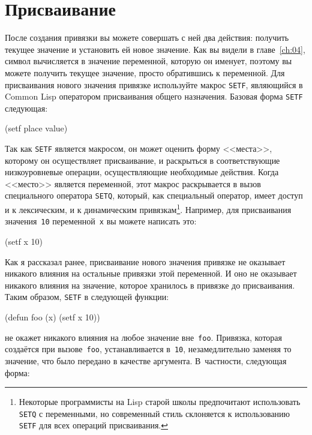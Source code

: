 \section{Присваивание}

После создания привязки вы можете совершать с ней два действия: получить текущее значение
и установить ей новое значение. Как вы видели в главе~\ref{ch:04}, символ вычисляется в
значение переменной, которую он именует, поэтому вы можете получить текущее значение,
просто обратившись к переменной. Для присваивания нового значения привязке используйте
макрос \lstinline{SETF}, являющийся в Common Lisp оператором присваивания общего назначения.
Базовая форма \lstinline{SETF} следующая:

\begin{myverb}
(setf place value)
\end{myverb}

Так как \lstinline{SETF} является макросом, он может оценить форму <<места>>, которому он
осуществляет присваивание, и раскрыться в соответствующие низкоуровневые
операции, осуществляющие необходимые действия. Когда <<место>> является переменной, этот
макрос раскрывается в вызов специального оператора \lstinline{SETQ}, который, как специальный
оператор, имеет доступ и к лексическим, и к динамическим привязкам\footnote{Некоторые
  программисты на Lisp старой школы предпочитают использовать \lstinline{SETQ} с переменными,
  но современный стиль склоняется к использованию \lstinline{SETF} для всех операций
  присваивания.}\hspace{\footnotenegspace}. Например, для присваивания значения~\lstinline{10} переменной~\lstinline{x} вы можете написать
это:

\begin{myverb}
(setf x 10)
\end{myverb}

Как я рассказал ранее, присваивание нового значения привязке не оказывает никакого влияния
на остальные привязки этой переменной. И оно не оказывает никакого влияния на значение,
которое хранилось в привязке до присваивания. Таким образом, \lstinline{SETF} в следующей
функции:

\begin{myverb}
(defun foo (x) (setf x 10))
\end{myverb}

\noindent{}не окажет никакого влияния на любое значение вне~\lstinline{foo}. Привязка, которая создаётся при
вызове~\lstinline{foo}, устанавливается в~\lstinline{10}, незамедлительно заменяя то значение, что было передано в
качестве аргумента. В~частности, следующая форма:

